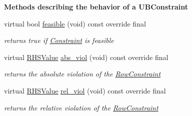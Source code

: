 \begin{Indent}\textbf{ Methods describing the behavior of a U\+B\+Constraint}\par
\begin{DoxyCompactItemize}
\item 
virtual bool \mbox{\hyperlink{class_s_m_spp__di__unipi__it_1_1_u_b_constraint_a575ce9dd82d423f5d6e9699622935415}{feasible}} (void) const override final
\begin{DoxyCompactList}\small\item\em returns true if \mbox{\hyperlink{class_s_m_spp__di__unipi__it_1_1_constraint}{Constraint}} is feasible \end{DoxyCompactList}\item 
virtual \mbox{\hyperlink{class_s_m_spp__di__unipi__it_1_1_row_constraint_a8813536ab3b13a81c8e83a999ade3bd8}{R\+H\+S\+Value}} \mbox{\hyperlink{class_s_m_spp__di__unipi__it_1_1_u_b_constraint_a1e06e555eab5078e4d5ec16745778984}{abs\+\_\+viol}} (void) const override final
\begin{DoxyCompactList}\small\item\em returns the absolute violation of the \mbox{\hyperlink{class_s_m_spp__di__unipi__it_1_1_row_constraint}{Row\+Constraint}} \end{DoxyCompactList}\item 
virtual \mbox{\hyperlink{class_s_m_spp__di__unipi__it_1_1_row_constraint_a8813536ab3b13a81c8e83a999ade3bd8}{R\+H\+S\+Value}} \mbox{\hyperlink{class_s_m_spp__di__unipi__it_1_1_u_b_constraint_a44cb3a18055d2b46764d4eb21a0ff032}{rel\+\_\+viol}} (void) const override final
\begin{DoxyCompactList}\small\item\em returns the relative violation of the \mbox{\hyperlink{class_s_m_spp__di__unipi__it_1_1_row_constraint}{Row\+Constraint}} \end{DoxyCompactList}\end{DoxyCompactItemize}
\end{Indent}

